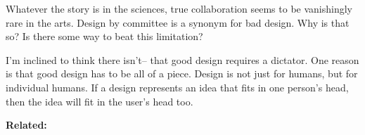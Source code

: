 Whatever the story
                  is in the sciences, true collaboration seems to be vanishingly
                  rare in the arts. Design by committee is a synonym for bad
                  design. Why is that so? Is there some way to beat this
                  limitation?

I'm inclined to think there isn't--
                  that good design requires a dictator. One reason is that good
                  design has to be all of a piece. Design is not just for
                  humans, but for individual humans. If a design represents an
                  idea that fits in one person's head, then the idea will fit in
                  the user's head too.



\textbf{Related:}


              
            
          
